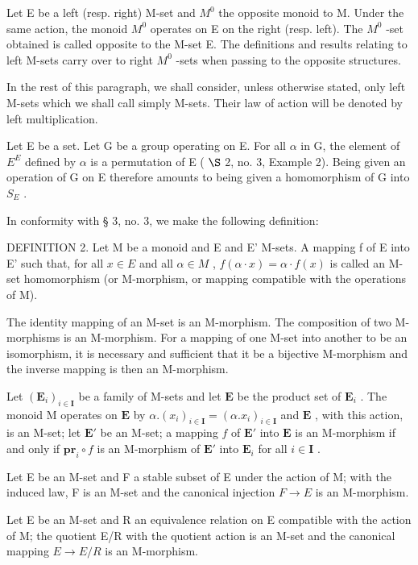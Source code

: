 Let E be a left (resp. right) M-set and \(M^{0}\) the opposite monoid to M. Under the same action, the monoid \(M^{0}\) operates on E on the right (resp. left). The \(M^{0}\) -set obtained is called opposite to the M-set E. The definitions and results relating to left M-sets carry over to right \(M^{0}\) -sets when passing to the opposite structures.

In the rest of this paragraph, we shall consider, unless otherwise stated, only left M-sets which we shall call simply M-sets. Their law of action will be denoted by left multiplication.

Let E be a set. Let G be a group operating on E. For all \(\alpha\) in G, the element of \(E^{E}\) defined by \(\alpha\) is a permutation of E ( \(\S\) 2, no. 3, Example 2). Being given an operation of G on E therefore amounts to being given a homomorphism of G into \(S_{E}\) .

In conformity with § 3, no. 3, we make the following definition:

DEFINITION 2. Let M be a monoid and E and E' M-sets. A mapping f of E into E' such that, for all \(x \in E\) and all \(\alpha \in M\) , \(f(\alpha \cdot x) = \alpha \cdot f(x)\) is called an M-set homomorphism (or M-morphism, or mapping compatible with the operations of M).

The identity mapping of an M-set is an M-morphism. The composition of two M-morphisms is an M-morphism. For a mapping of one M-set into another to be an isomorphism, it is necessary and sufficient that it be a bijective M-morphism and the inverse mapping is then an M-morphism.

Let \((\mathbf{E}_i)_{i\in \mathbf{I}}\) be a family of M-sets and let \(\mathbf{E}\) be the product set of \(\mathbf{E}_i\) . The monoid M operates on \(\mathbf{E}\) by \(\alpha .(x_i)_{i\in \mathbf{I}} = (\alpha .x_i)_{i\in \mathbf{I}}\) and \(\mathbf{E}\) , with this action, is an M-set; let \(\mathbf{E}'\) be an M-set; a mapping \(f\) of \(\mathbf{E}'\) into \(\mathbf{E}\) is an M-morphism if and only if \(\mathbf{pr}_i\circ f\) is an M-morphism of \(\mathbf{E}'\) into \(\mathbf{E}_i\) for all \(i\in \mathbf{I}\) .

Let E be an M-set and F a stable subset of E under the action of M; with the induced law, F is an M-set and the canonical injection \(F \rightarrow E\) is an M-morphism.

Let E be an M-set and R an equivalence relation on E compatible with the action of M; the quotient E/R with the quotient action is an M-set and the canonical mapping \(E \rightarrow E/R\) is an M-morphism.


